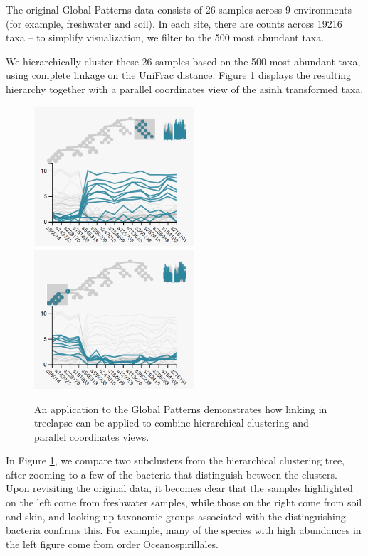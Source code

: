 \documentclass[12pt]{article}
\begin{document}
The original Global Patterns data consists of 26 samples across 9
environments (for example, freshwater and soil). In each site, there are
counts across 19216 taxa -- to simplify visualization, we filter to the
500 most abundant taxa.

We hierarchically cluster these 26 samples based on the 500 most
abundant taxa, using complete linkage on the UniFrac distance. Figure
\ref{fig:gptimebox} displays the resulting hierarchy together with a
parallel coordinates view of the \(\text{asinh}\) transformed taxa.

\begin{figure}
  {
    \centering
    \includegraphics[width=225px]{figure/gp_cluster1}
    \includegraphics[width=225px]{figure/gp_cluster2}
}

\caption{An application to the Global Patterns demonstrates how linking in
  treelapse can be applied to combine hierarchical clustering and parallel
  coordinates views.}\label{fig:gptimebox}
\end{figure}

In Figure \ref{fig:gptimebox}, we compare two subclusters from the
hierarchical clustering tree, after zooming to a few of the bacteria
that distinguish between the clusters. Upon revisiting the original
data, it becomes clear that the samples highlighted on the left come
from freshwater samples, while those on the right come from soil and
skin, and looking up taxonomic groups associated with the distinguishing
bacteria confirms this. For example, many of the species with high
abundances in the left figure come from order Oceanospirillales.
\end{document}
